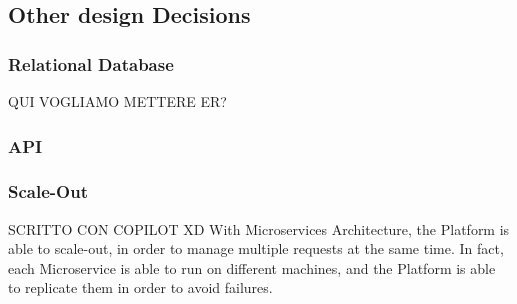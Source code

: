 \subsection{Other design Decisions}
\subsubsection{Relational Database}
QUI VOGLIAMO METTERE ER?
\subsubsection{API}
\subsubsection{Scale-Out}
SCRITTO CON COPILOT XD
With Microservices Architecture, the Platform is able to scale-out, in order to manage multiple requests at the same time. In fact, each Microservice is able to run on different machines, and the Platform is able to replicate them in order to avoid failures.